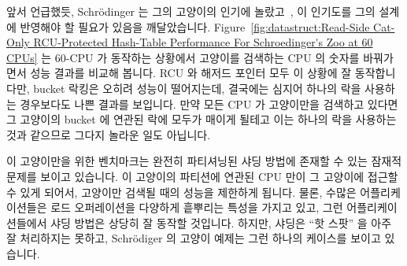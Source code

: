 앞서 언급했듯, Schr\"odinger 는 그의 고양이의 인기에
놀랐고~\cite{ErwinSchroedinger1935Cat}, 이 인기도를 그의 설계에 반영해야 할
필요가 있음을 깨달았습니다.
Figure~\ref{fig:datastruct:Read-Side Cat-Only RCU-Protected Hash-Table Performance For Schroedinger's Zoo at 60 CPUs}
는 60-CPU 가 동작하는 상황에서 고양이를 검색하는 CPU 의 숫자를 바꿔가면서 성능
결과를 비교해 봅니다.
RCU 와 해저드 포인터 모두 이 상황에 잘 동작합니다만, bucket 락킹은 오히려
성능이 떨어지는데, 결국에는 심지어 하나의 락을 사용하는 경우보다도 나쁜 결과를
보입니다.
만약 모든 CPU 가 고양이만을 검색하고 있다면 그 고양이의 bucket 에 연관된 락에
모두가 매이게 될테고 이는 하나의 락을 사용하는 것과 같으므로 그다지 놀라운 일도
아닙니다.

이 고양이만을 위한 벤치마크는 완전히 파티셔닝된 샤딩 방법에 존재할 수 있는
잠재적 문제를 보이고 있습니다.
이 고양이의 파티션에 연관된 CPU 만이 그 고양이에 접근할 수 있게 되어서,
고양이만 검색될 때의 성능을 제한하게 됩니다.
물론, 수많은 어플리케이션들은 로드 오퍼레이션을 다양하게 흩뿌리는 특성을 가지고
있고, 그런 어플리케이션들에서 샤딩 방법은 상당히 잘 동작할 것입니다.
하지만, 샤딩은 ``핫 스팟'' 을 아주 잘 처리하지는 못하고, Schr\"odiger 의 고양이
예제는 그런 하나의 케이스를 보이고 있습니다.

